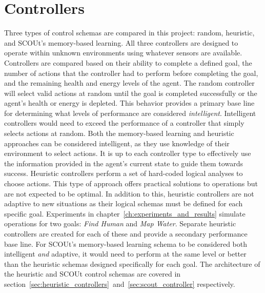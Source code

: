 
\chapter{Controllers} \label{ch:controllers}
Three types of control schemas are compared in this project: random, heuristic, and SCOUt's memory-based learning.
All three controllers are designed to operate within unknown environments using whatever sensors are available.
Controllers are compared based on their ability to complete a defined goal, the number of actions that the controller had to perform before completing the goal, and the remaining health and energy levels of the agent.
The random controller will select valid actions at random until the goal is completed successfully or the agent's health or energy is depleted.
This behavior provides a primary base line for determining what levels of performance are considered \textit{intelligent}.
Intelligent controllers would need to exceed the performance of a controller that simply selects actions at random.
Both the memory-based learning and heuristic approaches can be considered intelligent, as they use knowledge of their environment to select actions.
It is up to each controller type to effectively use the information provided in the agent's current state to guide them towards success.
Heuristic controllers perform a set of hard-coded logical analyses to choose actions.
This type of approach offers practical solutions to operations but are not expected to be optimal.
In addition to this, heuristic controllers are not adaptive to new situations as their logical schemas must be defined for each specific goal.
Experiments in chapter~\ref{ch:experiments_and_results} simulate operations for two goals: \textit{Find Human} and \textit{Map Water}.
Separate heuristic controllers are created for each of these and provide a secondary performance base line.
For SCOUt's memory-based learning schema to be considered both intelligent \textit{and} adaptive, it would need to perform at the same level or better than the heuristic schemas designed specifically for each goal.
The architecture of the heuristic and SCOUt control schemas are covered in section~\ref{sec:heuristic_controllers}~and~\ref{sec:scout_controller} respectively.



